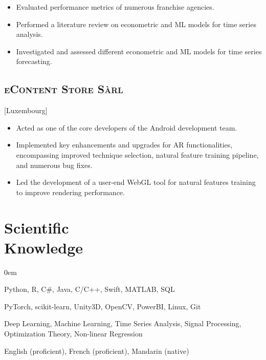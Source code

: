 \documentclass{mycv}
\begin{document}
\begin{positions}
\end{positions}

\begin{itemize}
  \itemsep 0em
  \item Evaluated performance metrics of numerous franchise agencies.
  \item Performed a literature review on econometric and ML models for time series analysis.
  \item Investigated and assessed different econometric and ML models for time series forecasting.
\end{itemize}

\subsection{\large \scshape eContent Store S\`arl}[Luxembourg]

\begin{positions}
\end{positions}

\begin{itemize}
  \itemsep 0em
  \item Acted as one of the core developers of the Android development team.
  \item Implemented key enhancements and upgrades for AR functionalities, encompassing improved technique selection, natural feature training pipeline, and numerous bug fixes.
  \item Led the development of a user-end WebGL tool for natural features training to improve rendering performance.
\end{itemize}

\section{Scientific \\ Knowledge}

\begin{description}
  \itemsep 0em
  \item[Programming] Python, R, C\#, Java, C/C++, Swift, MATLAB, SQL
  \item[Frameworks \& Tools] PyTorch, scikit-learn, Unity3D, OpenCV, PowerBI, Linux, Git
  \item[Skills \& Expertise] Deep Learning, Machine Learning, Time Series Analysis, Signal Processing, Optimization Theory, Non-linear Regression
  \item[Languages] English (proficient), French (proficient), Mandarin (native)
\end{description}
\end{document}
